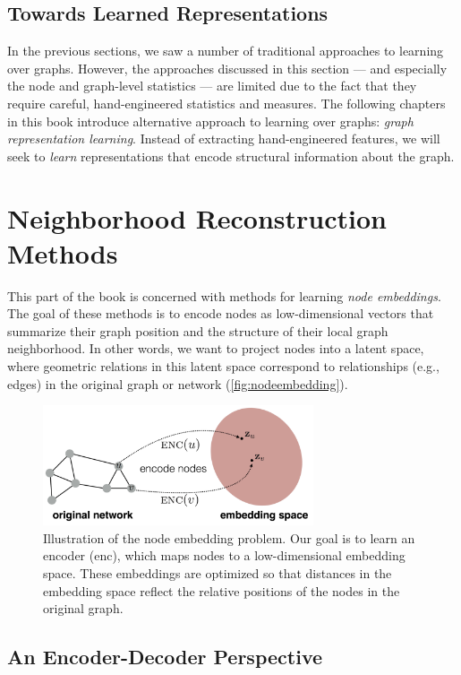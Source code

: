 \documentclass[10pt]{book}
\let\defaultmarginpar\marginpar
\renewcommand\marginpar[2][]{\defaultmarginpar{\itshape\color{gray}#2}}
\begin{document}
\subsection{Towards Learned Representations}

In the previous sections, we saw a number of traditional approaches to learning over graphs. However, the approaches discussed in this section --- and especially the node and graph-level statistics --- are limited due to the fact that they require careful, hand-engineered statistics and measures. The following chapters in this book introduce alternative approach to learning over graphs: \emph{graph representation learning}. Instead of extracting hand-engineered features, we will seek to \emph{learn} representations that encode structural information about the graph.


\section{Neighborhood Reconstruction Methods}

This part of the book is concerned with methods for learning \emph{node embeddings}\marginpar{node embeddings}. The goal of these methods is to encode nodes as low-dimensional vectors that summarize their graph position and the structure of their local graph neighborhood. In other words, we want to project nodes into a latent space, where geometric relations in this latent space correspond to relationships (e.g., edges) in the original graph or network (\autoref{fig:nodeembedding}).

\begin{figure}[ht]
    \centering
    \includegraphics[width=8cm]{figures/Node_embedding.png}
    \caption{Illustration of the node embedding problem. Our goal is to learn an encoder (enc), which maps nodes to a low-dimensional embedding space. These embeddings are optimized so that distances in the embedding space reflect the relative positions of the nodes in the original graph.}
    \label{fig:nodeembedding}
\end{figure}

\subsection{An Encoder-Decoder Perspective}
\end{document}
